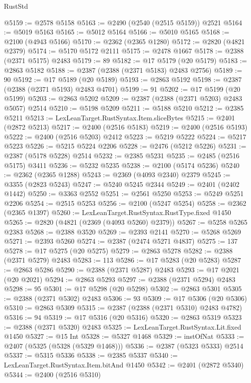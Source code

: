 \begin{lexlean}{RustStd}
\begin{coremodule}
{\begin{coremodule}
{{{{{{{{{{{{{{{{{{{{{{{{{{{{{{{{{{{{{{{{{{{{{{{{{{@5159 := @2578 @5158
@5163 := @2490 (@2540 (@2515 @5159)) @2521
@5164 := @5019 @5163
@5165 := @5012 @5164
@5166 := @5010 @5165
@5168 := @2100 (@4943 @5166)
@5170 := @2362 (@2365 @1280)
@5172 := @2820 (@4821 @2379)
@5174 := @5170 @5172 @2111
@5175 := @2478 @1667
@5178 := @2388 (@2371 @5175) @2483
@5179 := 89
@5182 := @17 @5179 (@20 @5179)
@5183 := @2863 @5182
@5188 := @2387 (@2388 (@2371 @5183) @2483 @2756)
@5189 := 90
@5192 := @17 @5189 (@20 @5189)
@5193 := @2863 @5192
@5198 := @2387 (@2388 (@2371 @5193) @2483 @4701)
@5199 := 91
@5202 := @17 @5199 (@20 @5199)
@5203 := @2863 @5202
@5209 := @2387 (@2388 (@2371 @5203) @2483 @5057) @2514
@5210 := @5198 @5209
@5211 := @5188 @5210
@5212 := @2385 @5211
@5213 := LexLeanTarget.RustSyntax.Item.sliceBytes
@5215 := @2401 (@2872 @5213)
@5217 := @2400 (@2516 @5183)
@5219 := @2400 (@2516 @5193)
@5222 := @2400 (@2516 @5203) @2412
@5223 := @5219 @5222
@5224 := @5217 @5223
@5226 := @5215 @5224 @2206
@5228 := @2476 (@5212 @5226)
@5231 := @2387 (@5178 @5228) @2514
@5232 := @2385 @5231
@5235 := @2485 (@2516 @5175) @3411
@5236 := @5232 @5235
@5238 := @2100 (@5174 @5236)
@5240 := @2362 (@2365 @1288)
@5243 := @2369 (@4093 @2340) @2379
@5245 := @3355 (@2823 @5243)
@5247 := @5240 @5245 @2344
@5249 := @2401 (@2402 @1442)
@5250 := @3363 @2552
@5251 := @2561 @5250
@5253 := @5249 @5251 @2206
@5254 := @2515 @5253
@5256 := @2100 (@5247 @5254)
@5258 := @2362 (@2365 @1397)
@5260 := LexLeanTarget.RustSyntax.RustType.fixed @1450
@5265 := @2820 (@4821 (@2369 (@4093 @5260) @2379))
@5267 := @5258 @5265 @2383
@5268 := @2388 @3520
@5269 := @2393 @2141
@5270 := @5268 @5269
@5271 := @2393 @5260
@5274 := @2387 (@2474 @5271 @4837)
@5275 := 137
@5278 := @17 @5275 (@20 @5275)
@5279 := @2863 @5278
@5282 := @2388 (@2371 @5279) @2483
@5283 := 113
@5286 := @17 @5283 (@20 @5283)
@5287 := @2863 @5286
@5290 := @2388 (@2371 @5287) @2483
@5293 := @17 @2021 (@20 @2021)
@5294 := @2863 @5293
@5297 := @2388 (@2371 @5294) @2483
@5298 := 95
@5301 := @17 @5298 (@20 @5298)
@5302 := @2863 @5301
@5305 := @2388 (@2371 @5302) @2483
@5306 := 93
@5309 := @17 @5306 (@20 @5306)
@5310 := @2863 @5309
@5315 := @2387 (@2388 (@2371 @5310) @2483 @4782)
@5316 := 94
@5319 := @17 @5316 (@20 @5316)
@5320 := @2863 @5319
@5323 := @2388 (@2371 @5320) @2483
@5325 := LexLeanTarget.RustSyntax.Lit.fixed @1450
@5327 := @15 Int
@5328 := @5327 @1468
@5329 := instOfNat
@5333 := @2407 (@5325 (@5328 (@5329 @1468)))
@5336 := @2387 (@5323 @5333) @2514
@5337 := @5315 @5336
@5338 := @2385 @5337
@5340 := LexLeanTarget.RustSyntax.Item.bitAnd @1450
@5342 := @2401 (@2872 @5340)
@5344 := @2400 (@2516 @5310)
}}}}}}}}}}}}}}}}}}}}}}}}}}}}}}}}}}}}}}}}}}}}}}}}}}
\end{coremodule}}
\end{coremodule}
\end{lexlean}
